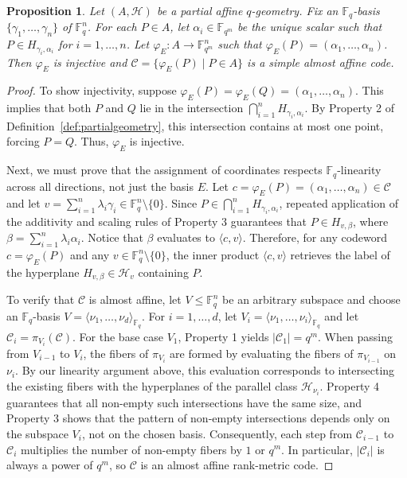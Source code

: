 \documentclass[a4paper,11pt,reqno]{article}
\newcommand{\F}{\mathbb{F}}
\newcommand{\C}{\mathcal{C}}
\theoremstyle{plain} \numberwithin{equation}{section}
\newtheorem{proposition}[theorem]{Proposition}
\theoremstyle{definition}
\renewcommand{\phi}{\varphi}
\begin{document}
\begin{proposition}
    Let $(A,\mathcal{H})$ be a partial affine $q$-geometry. Fix an $\F_q$-basis $\{\gamma_1,\ldots,\gamma_n\}$ of $\F_q^n$. For each $P\in A$, let $\alpha_i\in \F_{q^m}$ be the unique scalar such that $P \in H_{\gamma_i,\alpha_i}$ for $i=1,\ldots,n$. Let $\phi_E \colon A \rightarrow \F_{q^m}^n$ such that $\phi_E(P) = (\alpha_1,\ldots,\alpha_n)$. Then $\phi_E$ is injective and $\C = \{\phi_E(P) \mid P \in A\}$ is a simple almost affine code.
\end{proposition}
\begin{proof}
    To show injectivity, suppose $\phi_E(P) = \phi_E(Q) = (\alpha_1, \ldots, \alpha_n)$. This implies that both $P$ and $Q$ lie in the intersection $\bigcap_{i=1}^n H_{\gamma_i, \alpha_i}$. By Property 2 of Definition~\ref{def:partialgeometry}, this intersection contains at most one point, forcing $P = Q$. Thus, $\phi_E$ is injective.

    Next, we must prove that the assignment of coordinates respects $\F_q$-linearity across all directions, not just the basis $E$. Let $c = \phi_E(P) = (\alpha_1, \ldots, \alpha_n) \in \mathcal{C}$ and let $v = \sum_{i=1}^n \lambda_i \gamma_i \in \F_q^n \setminus \{0\}$. Since $P \in \bigcap_{i=1}^n H_{\gamma_i, \alpha_i}$, repeated application of the additivity and scaling rules of Property 3 guarantees that $P \in H_{v, \beta}$, where $\beta = \sum_{i=1}^n \lambda_i \alpha_i$. Notice that $\beta$ evaluates to $\langle c, v \rangle$. Therefore, for any codeword $c = \phi_E(P)$ and any $v \in \F_q^n \setminus \{0\}$, the inner product $\langle c, v \rangle$ retrieves the label of the hyperplane $H_{v, \beta} \in \mathcal{H}_v$ containing $P$.

    To verify that $\mathcal{C}$ is almost affine, let $V \le \F_q^n$ be an arbitrary subspace and choose an $\F_q$-basis $V = \langle \nu_1, \ldots, \nu_d \rangle_{\F_q}$. For $i=1,\ldots,d$, let $V_i = \langle \nu_1, \ldots, \nu_i \rangle_{\F_q}$ and let $\mathcal{C}_i = \pi_{V_i}(\mathcal{C})$. For the base case $V_1$, Property 1 yields $|\mathcal{C}_1| = q^m$. When passing from $V_{i-1}$ to $V_i$, the fibers of $\pi_{V_i}$ are formed by evaluating the fibers of $\pi_{V_{i-1}}$ on $\nu_i$. By our linearity argument above, this evaluation corresponds to intersecting the existing fibers with the hyperplanes of the parallel class $\mathcal{H}_{\nu_i}$. Property 4 guarantees that all non-empty such intersections have the same size, and Property 3 shows that the pattern of non-empty intersections depends only on the subspace $V_i$, not on the chosen basis. Consequently, each step from $\mathcal{C}_{i-1}$ to $\mathcal{C}_i$ multiplies the number of non-empty fibers by $1$ or $q^m$. In particular, $|\mathcal{C}_i|$ is always a power of $q^m$, so $\mathcal{C}$ is an almost affine rank-metric code.


\end{proof}
\end{document}
